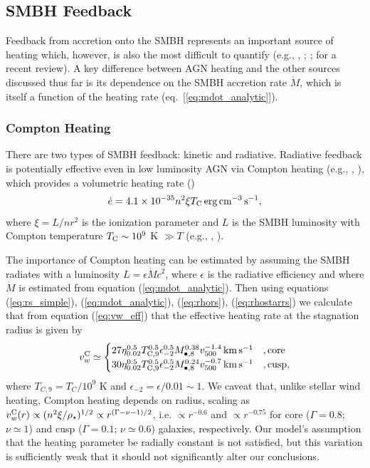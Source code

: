 \documentclass[usenatbib,fleqn]{mn2e}
\newcommand{\densSlope}{\nu}
\begin{document}
\subsection{SMBH Feedback}

Feedback from accretion onto the SMBH represents an important source of heating which, however, is also the most difficult to quantify (e.g., \citealt{Brighenti&Mathews03}, \citealt{DiMatteo+05}; \citealt{Kurosawa&Proga09}; \citealt{Fabian12} for a recent review).  A key difference between AGN heating and the other sources discussed thus far is its dependence on the SMBH accretion rate $\dot{M}$, which is itself a function of the heating rate (eq.~[\ref{eq:mdot_analytic}]).  

\subsubsection{Compton Heating}

There are two types of SMBH feedback: kinetic and radiative.
Radiative feedback is potentially effective even in low luminosity AGN
via Compton heating (e.g., \citealt{Sazonov+04}, \citealt{Ciotti+10}),
which provides a volumetric heating rate (\citealt{Gan+14})
\begin{align}
\dot{e} = 4.1\times 10^{-35}n^{2}\xi T_{\rm C}\,{\rm erg\,cm^{-3}\,s^{-1}},
\end{align}
where $\xi = L/n r^{2}$ is the ionization parameter and $L$ is the SMBH luminosity with Compton temperature $T_{\rm C} \sim 10^{9}$ K $\gg T$ (e.g., \citealt{Ho99}, \citealt{Eracleous+10}).  

The importance of Compton heating can be estimated by assuming the SMBH
radiates with a luminosity $L = \epsilon \dot{M}c^{2}$, where
$\epsilon$ is the radiative efficiency and where $\dot{M}$ is
estimated from equation (\ref{eq:mdot_analytic}).  Then using
equations (\ref{eq:rs_simple}), (\ref{eq:mdot_analytic}),
(\ref{eq:rhors}), (\ref{eq:rhostarrs}) we calculate that from equation
(\ref{eq:vw_eff}) that the effective heating rate at the stagnation radius is given by
\begin{align} v_{w}^{\rm C} \simeq
  \begin{cases} 27 \eta_{0.02}^{0.5}T_{\rm
C,9}^{0.5}\epsilon_{-2}^{0.5} M_{\bullet,8}^{0.38}v_{500}^{-1.4}\,{\rm
km\,s^{-1}} &, \text{core}\\ 30 \eta_{0.02}^{0.5}T_{\rm
C,9}^{0.5}\epsilon_{-2}^{0.5} M_{\bullet,8}^{0.24}v_{500}^{-0.7}\,{\rm
km\,s^{-1}} &, \text{cusp},
  \end{cases}
  \label{eq:vC}
\end{align} where $T_{C,9} = T_{C}/10^{9}$ K and $\epsilon_{-2} =
\epsilon/0.01 \sim 1$.  We caveat that, unlike stellar wind heating,
Compton heating depends on radius, scaling as $v_{w}^{\rm C}(r)
\propto (n^{2}\xi/\rho_{\star})^{1/2} \propto
r^{(\Gamma-\densSlope-1)/2}$, i.e. $\propto r^{-0.6}$ and $\propto
r^{-0.75}$ for core ($\Gamma = 0.8$; $\densSlope \simeq 1$) and cusp
($\Gamma = 0.1$; $\densSlope \simeq 0.6$) galaxies, respectively.  Our
model's assumption that the heating parameter be radially constant is
not satisfied, but this variation is sufficiently weak that it should
not significantly alter our conclusions.
\end{document}
